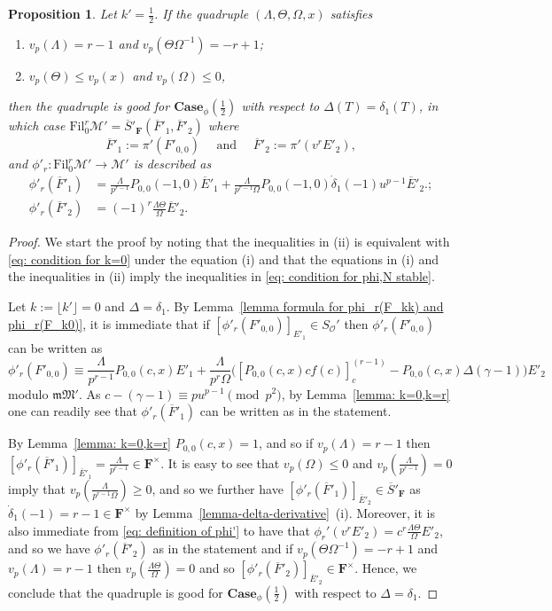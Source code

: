 \documentclass[11pt]{amsart}
\theoremstyle{definition}
\numberwithin{equation}{subsection}
\theoremstyle{plain}
\theoremstyle{plain}
\theoremstyle{plain}
\theoremstyle{plain}
\theoremstyle{plain}
\theoremstyle{plain}
\theoremstyle{plain}
\theoremstyle{plain}
\newtheorem{prop}[equation]{Proposition}
\theoremstyle{plain}
\theoremstyle{plain}
\theoremstyle{plain}
\theoremstyle{plain}
\theoremstyle{definition}
\theoremstyle{definition}
\theoremstyle{definition}
\theoremstyle{remark}
\renewcommand{\(}{\textup{(}}
\renewcommand{\)}{\textup{)}}
\newcommand{\F}{\mathbf{F}}
\newcommand{\barS}{\overline{S}}
\newcommand{\cM}{\mathcal{M}}
\newcommand{\fM}{\mathfrak{M}}
\newcommand{\fm}{\mathfrak{m}}
\newcommand{\Fil}{\mathrm{Fil}}
\newcommand{\cO}{\mathcal{O}}
\newcommand{\barE}{\overline{E}}
\newcommand{\barF}{\overline{F}}
\begin{document}
\begin{prop}\label{prop-cM-Case-0}
Let $k'=\frac{1}{2}$. If the quadruple $(\Lambda,\Theta,\Omega,x)$ satisfies
\begin{enumerate}[leftmargin=*]
 \item $v_p(\Lambda)=r-1$ and $v_p(\Theta\Omega^{-1})=-r+1$;
 \item $v_p(\Theta)\leq v_p(x)$ and $v_p(\Omega)\leq 0$,
\end{enumerate}
then the quadruple is good for $\mathbf{Case}_\phi(\frac{1}{2})$ with respect to $\Delta(T)=\delta_1(T)$, in which case
$\Fil^r_{0}\cM'=\barS'_\F(\barF'_1,\barF'_2)$ where
$$\barF'_1:=\pi'(F'_{0,0})\quad\mbox{ and }\quad\barF'_2:=\pi'(v^rE'_2),$$
and $\phi'_r:\Fil^r_{0}\cM'\to \cM'$ is described as
    \begin{align*}
    \phi'_r(\barF'_1) &=\frac{\Lambda}{p^{r-1}} P_{0,0}(-1,0)\barE'_1 +\frac{\Lambda}{p^{r-1}\Omega}P_{0,0}(-1,0)\dot{\delta}_1(-1)u^{p-1}\barE'_2.;\\
    \phi'_r(\barF'_2) &=(-1)^r\frac{\Lambda\Theta}{\Omega}\barE'_2.
    \end{align*}
\end{prop}


\begin{proof}
We start the proof by noting that the inequalities in (ii) is equivalent with \eqref{eq: condition for k=0} under the equation (i) and that the equations in (i) and the inequalities in (ii) imply the inequalities in \eqref{eq: condition for phi,N stable}.


Let $k:=\lfloor k'\rfloor=0$ and $\Delta=\delta_1$. By Lemma~\ref{lemma formula for phi_r(F_kk) and phi_r(F_k0)}, it is immediate that if $[\phi'_r(F'_{0,0})]_{E'_1}\in S_{\cO}'$ then $\phi'_r(F'_{0,0})$ can be written as
\begin{equation*}
\phi'_r(F'_{0,0})\equiv\frac{\Lambda }{p^{r-1}}P_{0,0}(c,x)E'_1 +\frac{\Lambda}{p^{r}\Omega}\big([P_{0,0}(c,x)cf(c)]_c^{(r-1)}-P_{0,0}(c,x)\Delta(\gamma-1)\big)E'_2
\end{equation*}
modulo $\fm\fM'$. As $c-(\gamma-1)\equiv pu^{p-1}\pmod{p^2}$, by Lemma~\ref{lemma: k=0,k=r} one can readily see that $\phi'_r(\barF'_1)$ can be written as in the statement.



By Lemma~\ref{lemma: k=0,k=r} $P_{0,0}(c,x)=1$, and so if $v_p(\Lambda)=r-1$ then $[\phi'_r(\barF'_1)]_{\barE'_1}=\frac{\Lambda}{p^{r-1}}\in\F^\times$. It is easy to see that $v_p(\Omega)\leq 0$ and $v_p(\frac{\Lambda}{p^{r-1}})=0$ imply that $v_p(\frac{\Lambda}{p^{r-1}\Omega})\geq 0$, and so we further have $[\phi'_r(\barF'_1)]_{\barE'_2}\in \barS'_\F$ as $\dot{\delta}_1(-1)=r-1\in\F^{\times}$ by Lemma~\ref{lemma-delta-derivative}~(i).
Moreover, it is also immediate from \eqref{eq: definition of phi'} to have that $\phi_r'(v^rE'_2)=c^r\frac{\Lambda\Theta}{\Omega} E'_2$, and so we have $\phi'_r(\barF'_2)$ as in the statement and if $v_p(\Theta\Omega^{-1})=-r+1$ and $v_p(\Lambda)=r-1$ then $v_p(\frac{\Lambda\Theta}{\Omega})=0$ and so $[\phi'_r(\barF'_2)]_{\barE'_2}\in \F^\times$. Hence, we conclude that
the quadruple is good for $\mathbf{Case}_\phi(\frac{1}{2})$ with respect to $\Delta=\delta_1$.
\end{proof}
\end{document}
